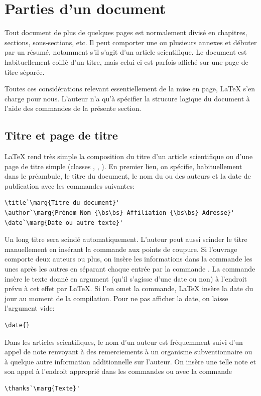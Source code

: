 \section{Parties d'un document}

Tout document de plus de quelques pages est normalement divisé en
chapitres, sections, sous-sections, etc. Il peut comporter une ou
plusieurs annexes et débuter par un résumé, notamment s'il s'agit d'un
article scientifique. Le document est habituellement coiffé d'un
titre, mais celui-ci est parfois affiché sur une page de titre
séparée.

Toutes ces considérations relevant essentiellement de la mise en page,
{\LaTeX} s'en charge pour nous. L'auteur n'a qu'à spécifier la
strucure logique du document à l'aide des commandes de la présente
section.

\subsection{Titre et page de titre}
\label{sec:organisation:parties:titre}

{\LaTeX} rend très simple la composition du titre d'un article
scientifique ou d'une page de titre simple (classes ,
, ). En premier lieu, on spécifie,
habituellement dans le préambule, le titre du document, le nom du ou
des auteurs et la date de publication avec les commandes suivantes:
\begin{lstlisting}
\title`\marg{Titre du document}'
\author`\marg{Prénom Nom {\bs\bs} Affiliation {\bs\bs} Adresse}'
\date`\marg{Date ou autre texte}'
\end{lstlisting}
Un long titre sera scindé automatiquement. L'auteur peut aussi scinder
le titre manuellement en insérant la commande {\bs\bs} aux points de
coupure. %
Si l'ouvrage comporte deux auteurs ou plus, on insère les informations
dans la commande \cmd{\author} les unes après les autres en séparant
chaque entrée par la commande \cmdprint{\and}. %
La commande \cmd{\date} insère le texte donné en argument (qu'il
s'agisse d'une date ou non) à l'endroit prévu à cet effet par
{\LaTeX}. Si l'on omet la commande, {\LaTeX} insère la date du jour au
moment de la compilation. Pour ne pas afficher la date, on laisse
l'argument vide:
\begin{lstlisting}
\date{}
\end{lstlisting}

Dans les articles scientifiques, le nom d'un auteur est fréquemment
suivi d'un appel de note renvoyant à des remerciements à un organisme
subventionnaire ou à quelque autre information additionnelle sur
l'auteur. On insère une telle note et son appel à l'endroit approprié
dans les commandes \cmd{\title} ou \cmd{\author} avec la commande
\begin{lstlisting}
\thanks`\marg{Texte}'
\end{lstlisting}


